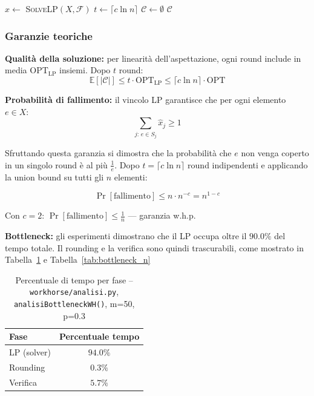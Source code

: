 \documentclass[12pt, a4paper]{article}
\begin{document}
\begin{algorithm}[H]
\caption{Randomized Rounding Set Cover (Monte Carlo) - pseudocodice}
$\hat{x} \leftarrow$ \textsc{SolveLP}$(X, \mathcal{F})$\;
$t \leftarrow \lceil c \ln n \rceil$\;
$\mathcal{C} \leftarrow \emptyset$\;
\Return $\mathcal{C}$\;
\end{algorithm}

\subsubsection*{Garanzie teoriche}

\textbf{Qualità della soluzione:} per linearità dell'aspettazione, 
ogni round include in media $\mathrm{OPT}_{\mathrm{LP}}$ insiemi. 
Dopo $t$ round:
$$\mathbb{E}[|\mathcal{C}|] \leq t \cdot \mathrm{OPT}_{\mathrm{LP}} 
\leq \lceil c \ln n \rceil \cdot \mathrm{OPT}$$

\textbf{Probabilit\`a di fallimento:} il vincolo LP garantisce 
che per ogni elemento $e \in X$:
$$\sum_{j:\, e \in S_j} \hat{x}_j \geq 1$$

Sfruttando questa garanzia si dimostra che la probabilit\`a 
che $e$ non venga coperto in un singolo round \`e al pi\`u 
$\frac{1}{e}$. Dopo $t = \lceil c \ln n \rceil$ round 
indipendenti e applicando la union bound su tutti gli $n$ elementi:

$$\Pr[\text{fallimento}] \leq n \cdot n^{-c} = n^{1-c}$$

Con $c=2$: $\Pr[\text{fallimento}] \leq \frac{1}{n}$ — garanzia w.h.p.


\textbf{Bottleneck:} gli esperimenti dimostrano che il LP occupa 
oltre il $90.0\%$ del tempo totale. Il rounding e la verifica sono quindi
trascurabili, come mostrato in Tabella~\ref{tab:bottleneck_pct} e Tabella~\ref{tab:bottleneck_n}

\begin{table}[H]
\centering
\caption{Percentuale di tempo per fase -- 
\texttt{workhorse/analisi.py}, \texttt{analisiBottleneckWH()}, m=50, p=0.3}
\label{tab:bottleneck_pct}
\begin{tabular}{lc}
\toprule
Fase & Percentuale tempo \\
\midrule
LP (solver) & $94.0\%$ \\
Rounding    & $0.3\%$  \\
Verifica    & $5.7\%$  \\
\bottomrule
\end{tabular}
\end{table}
\end{document}
